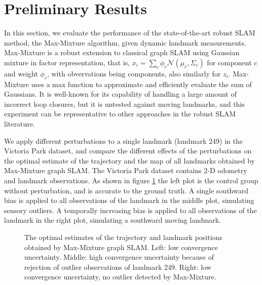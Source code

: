 \section{Preliminary Results}

In this section, we evaluate the performance of the state-of-the-art robust
SLAM method, the Max-Mixture algorithm, given dynamic landmark measurements.
Max-Mixture is a robust extension to classical graph SLAM using Gaussian
mixture in factor representation, that is, $ x_i = \sum_c \phi_c
\mathcal{N}(\mu_c, \Sigma_c)$ for component $c$ and weight $\phi_c$, with
obvervations being components, also similarly for $z_i$. Max-Mixture uses a max
function to approximate and efficiently evaluate the sum of Gaussians. It is
well-known for its capability of handling a large amount of incorrect loop
closures, but it is untested against moving landmarks, and this experiment can
be representative to other approaches in the robust SLAM literature. 

We apply different perturbations to a single landmark (landmark 249) in the
Victoria Park dataset, and compare the different effects of the perturbations
on the optimal estimate of the trajectory and the map of all landmarks obtained
by Max-Mixture graph SLAM. The Victoria Park dataset contains 2-D odometry and
landmark observations. As shown in figure \ref{fig:baseline} the left plot is
the control group without perturbation, and is accurate to the ground truth. A
single southward bias is applied to all observations of the
landmark in the middle plot, simulating sensory outliers. A temporally
increasing bias is applied to all observations of the landmark in the right
plot, simulating a southward moving landmark.

\begin{figure}[h]
\caption{The optimal estimates of the trajectory and landmark positions
obtained by Max-Mixture graph SLAM.  Left: low convergence uncertainty. Middle:
high convergence uncertainty because of rejection of outlier observations
of landmark 249.  Right: low convergence uncertainty, no outlier
detected by Max-Mixture.}
\label{fig:baseline}
\end{figure}

